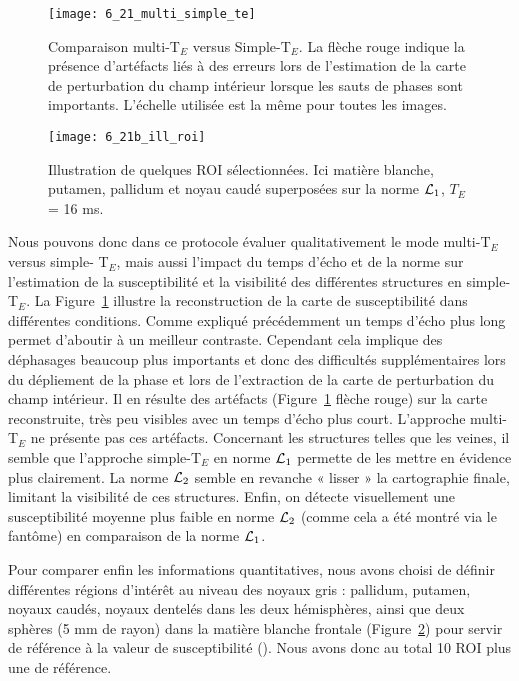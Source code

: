 {%
\begin{figure}[!t]
\centering
\texttt{[image: 6\_21\_multi\_simple\_te]}
\caption{Comparaison multi-T$_E$ versus Simple-T$_E$. La flèche rouge indique la présence d’artéfacts liés à des erreurs
lors de l’estimation de la carte de perturbation du champ intérieur lorsque les sauts de phases sont importants.
L’échelle utilisée est la même pour toutes les images.}
\label{fig:6_21_multi_simple_te}	
\end{figure}
\begin{figure}[!b]
\centering
\texttt{[image: 6\_21b\_ill\_roi]}
\caption{Illustration de quelques ROI sélectionnées. Ici matière blanche, putamen, pallidum et noyau caudé
superposées sur la norme ${\cal L}_1$, $T_E$= 16 ms.}
\label{fig:6_21b_ill_roi}	
\end{figure}
Nous pouvons donc dans ce protocole évaluer qualitativement le mode multi-T$_E$ versus simple-
T$_E$, mais aussi l’impact du temps d’écho et de la norme sur l’estimation de la susceptibilité et la visibilité
des différentes structures en simple-T$_E$. La Figure~\ref{fig:6_21_multi_simple_te} illustre la reconstruction de la carte de
susceptibilité dans différentes conditions. Comme expliqué précédemment un temps d’écho plus long
permet d’aboutir à un meilleur contraste. Cependant cela implique des déphasages beaucoup plus
importants et donc des difficultés supplémentaires lors du dépliement de la phase et lors de
l’extraction de la carte de perturbation du champ intérieur. Il en résulte des artéfacts (Figure~\ref{fig:6_21_multi_simple_te} flèche
rouge) sur la carte reconstruite, très peu visibles avec un temps d’écho plus court. L’approche multi-
T$_E$ ne présente pas ces artéfacts. Concernant les structures telles que les veines, il semble que
l’approche simple-T$_E$ en norme ${\cal L}_1$ permette de les mettre en évidence plus clairement. La norme ${\cal L}_2$
semble en revanche « lisser » la cartographie finale, limitant la visibilité de ces structures. Enfin, on
détecte visuellement une susceptibilité moyenne plus faible en norme ${\cal L}_2$ (comme cela a été montré
via le fantôme) en comparaison de la norme ${\cal L}_1$.

Pour comparer enfin les informations quantitatives, nous avons choisi de définir différentes
régions d’intérêt au niveau des noyaux gris : pallidum, putamen, noyaux caudés, noyaux dentelés dans
les deux hémisphères, ainsi que deux sphères (5 mm de rayon) dans la matière blanche frontale (Figure~\ref{fig:6_21b_ill_roi}) pour servir de référence à la valeur de susceptibilité (\cite{Schweser2011}). Nous avons donc au total 10 ROI plus
une de référence.

}
